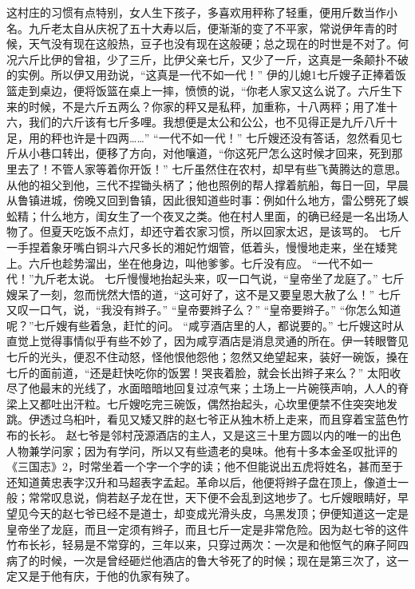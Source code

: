 \documentclass[12pt,UTF8]{ctexbook}
\begin{document}
这村庄的习惯有点特别，女人生下孩子，多喜欢用秤称了轻重，便用斤数当作小名。九斤老太自从庆祝了五十大寿以后，便渐渐的变了不平家，常说伊年青的时候，天气没有现在这般热，豆子也没有现在这般硬；总之现在的时世是不对了。何况六斤比伊的曾祖，少了三斤，比伊父亲七斤，又少了一斤，这真是一条颠扑不破的实例。所以伊又用劲说，“这真是一代不如一代！”
伊的儿媳1七斤嫂子正捧着饭篮走到桌边，便将饭篮在桌上一摔，愤愤的说，“你老人家又这么说了。六斤生下来的时候，不是六斤五两么？你家的秤又是私秤，加重称，十八两秤；用了准十六，我们的六斤该有七斤多哩。我想便是太公和公公，也不见得正是九斤八斤十足，用的秤也许是十四两……”
“一代不如一代！”
七斤嫂还没有答话，忽然看见七斤从小巷口转出，便移了方向，对他嚷道，“你这死尸怎么这时候才回来，死到那里去了！不管人家等着你开饭！”
七斤虽然住在农村，却早有些飞黄腾达的意思。从他的祖父到他，三代不捏锄头柄了；他也照例的帮人撑着航船，每日一回，早晨从鲁镇进城，傍晚又回到鲁镇，因此很知道些时事：例如什么地方，雷公劈死了蜈蚣精；什么地方，闺女生了一个夜叉之类。他在村人里面，的确已经是一名出场人物了。但夏天吃饭不点灯，却还守着农家习惯，所以回家太迟，是该骂的。
七斤一手捏着象牙嘴白铜斗六尺多长的湘妃竹烟管，低着头，慢慢地走来，坐在矮凳上。六斤也趁势溜出，坐在他身边，叫他爹爹。七斤没有应。
“一代不如一代！”九斤老太说。
七斤慢慢地抬起头来，叹一口气说，“皇帝坐了龙庭了。”
七斤嫂呆了一刻，忽而恍然大悟的道，“这可好了，这不是又要皇恩大赦了么！”
七斤又叹一口气，说，“我没有辫子。”
“皇帝要辫子么？”
“皇帝要辫子。”
“你怎么知道呢？”七斤嫂有些着急，赶忙的问。
“咸亨酒店里的人，都说要的。”
七斤嫂这时从直觉上觉得事情似乎有些不妙了，因为咸亨酒店是消息灵通的所在。伊一转眼瞥见七斤的光头，便忍不住动怒，怪他恨他怨他；忽然又绝望起来，装好一碗饭，搡在七斤的面前道，“还是赶快吃你的饭罢！哭丧着脸，就会长出辫子来么？”
太阳收尽了他最末的光线了，水面暗暗地回复过凉气来；土场上一片碗筷声响，人人的脊梁上又都吐出汗粒。七斤嫂吃完三碗饭，偶然抬起头，心坎里便禁不住突突地发跳。伊透过乌桕叶，看见又矮又胖的赵七爷正从独木桥上走来，而且穿着宝蓝色竹布的长衫。
赵七爷是邻村茂源酒店的主人，又是这三十里方圆以内的唯一的出色人物兼学问家；因为有学问，所以又有些遗老的臭味。他有十多本金圣叹批评的《三国志》2，时常坐着一个字一个字的读；他不但能说出五虎将姓名，甚而至于还知道黄忠表字汉升和马超表字孟起。革命以后，他便将辫子盘在顶上，像道士一般；常常叹息说，倘若赵子龙在世，天下便不会乱到这地步了。七斤嫂眼睛好，早望见今天的赵七爷已经不是道士，却变成光滑头皮，乌黑发顶；伊便知道这一定是皇帝坐了龙庭，而且一定须有辫子，而且七斤一定是非常危险。因为赵七爷的这件竹布长衫，轻易是不常穿的，三年以来，只穿过两次：一次是和他怄气的麻子阿四病了的时候，一次是曾经砸烂他酒店的鲁大爷死了的时候；现在是第三次了，这一定又是于他有庆，于他的仇家有殃了。
\end{document}

